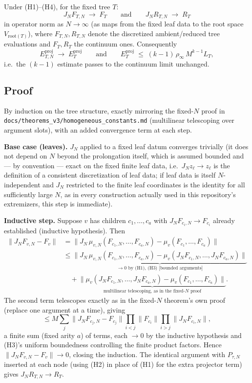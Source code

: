Under (H1)–(H4), for the fixed tree $T$:
\[
  J_N F_{T,N} \;\longrightarrow\; F_T
  \qquad\text{and}\qquad
  J_N R_{T,N} \;\longrightarrow\; R_T
\]
in operator norm as $N\to\infty$ (as maps from the fixed leaf data to
the root space $V_{\mathrm{root}(T)}$), where $F_{T,N}, R_{T,N}$ denote
the discretized ambient/reduced tree evaluations and $F_T, R_T$ the
continuum ones. Consequently
\[
  E_{T,N}^{\mathrm{proj}} \;\longrightarrow\; E_T^{\mathrm{proj}}
  \qquad\text{and}\qquad
  E_T^{\mathrm{proj}} \;\le\; (k-1)\,\rho_\infty\, M^{k-1} L_T,
\]
i.e.\ the $(k-1)$ estimate passes to the continuum limit unchanged.

\subsection*{Proof}

By induction on the tree structure, exactly mirroring the fixed-$N$
proof in \texttt{docs/theorems\_v3/homogeneous\_constants.md} (multilinear
telescoping over argument slots), with an added convergence term at each
step.

\textbf{Base case (leaves).} $J_N$ applied to a fixed leaf datum
converges trivially (it does not depend on $N$ beyond the prolongation
itself, which is assumed bounded and — by convention — exact on the
fixed finite leaf data, i.e.\ $J_N z_\ell \to z_\ell$ is the definition
of a consistent discretization of leaf data; if leaf data is itself
$N$-independent and $J_N$ restricted to the finite leaf coordinates is
the identity for all sufficiently large $N$, as in every construction
actually used in this repository's extremizers, this step is immediate).

\textbf{Inductive step.} Suppose $v$ has children $c_1,\dots,c_a$ with
$J_N F_{c_i,N} \to F_{c_i}$ already established (inductive hypothesis).
Then
\begin{align*}
  \big\| J_N F_{v,N} - F_v \big\|
  &= \big\| J_N\,\mu_{v,N}(F_{c_1,N},\dots,F_{c_a,N})
      - \mu_v(F_{c_1},\dots,F_{c_a}) \big\| \\
  &\le \underbrace{\big\| J_N\,\mu_{v,N}(F_{c_1,N},\dots,F_{c_a,N})
      - \mu_v(J_N F_{c_1,N},\dots,J_N F_{c_a,N}) \big\|}_{\to 0 \text{ by (H1), (H3) [bounded arguments]}} \\
  &\quad + \underbrace{\big\| \mu_v(J_N F_{c_1,N},\dots,J_N F_{c_a,N})
      - \mu_v(F_{c_1},\dots,F_{c_a}) \big\|}_{\text{multilinear telescoping, as in the fixed-}N\text{ proof}}.
\end{align*}
The second term telescopes exactly as in the fixed-$N$ theorem's own
proof (replace one argument at a time), giving
\[
  \le M \sum_j \big\| J_N F_{c_j,N} - F_{c_j} \big\|
  \prod_{i<j} \|F_{c_i}\| \prod_{i>j} \|J_N F_{c_i,N}\|,
\]
a finite sum (fixed arity $a$) of terms, each $\to 0$ by the inductive
hypothesis and (H3)'s uniform boundedness controlling the finite product
factors. Hence $\|J_N F_{v,N} - F_v\| \to 0$, closing the induction. The
identical argument with $P_{\tau,N}$ inserted at each node (using (H2) in
place of (H1) for the extra projector term) gives $J_N R_{T,N} \to R_T$.

